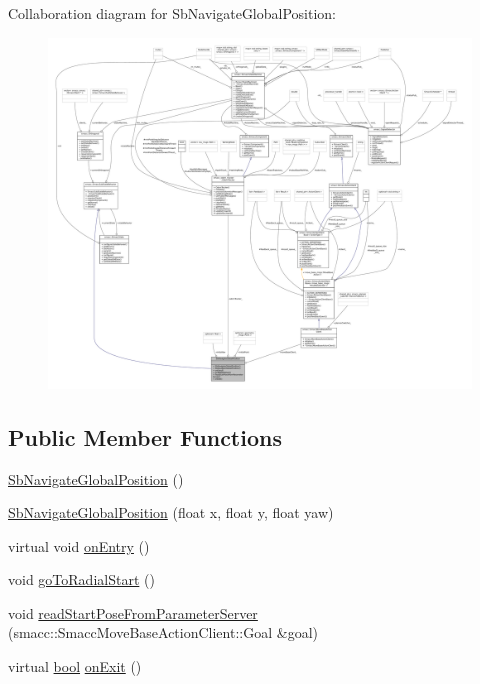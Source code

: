 Collaboration diagram for Sb\+Navigate\+Global\+Position\+:
\nopagebreak
\begin{figure}[H]
\begin{center}
\leavevmode
\includegraphics[width=350pt]{classSbNavigateGlobalPosition__coll__graph}
\end{center}
\end{figure}
\subsection*{Public Member Functions}
\begin{DoxyCompactItemize}
\item 
\hyperlink{classSbNavigateGlobalPosition_a6e1b74179781852ff41ffee65f1f01f4}{Sb\+Navigate\+Global\+Position} ()
\item 
\hyperlink{classSbNavigateGlobalPosition_a4215729ce8800e8fcfb30a120626348e}{Sb\+Navigate\+Global\+Position} (float x, float y, float yaw)
\item 
virtual void \hyperlink{classSbNavigateGlobalPosition_ae4c1f2e5de1077ee88d506eb69099f0c}{on\+Entry} ()
\item 
void \hyperlink{classSbNavigateGlobalPosition_a37b56e88ae4b01413c8fff19ee319769}{go\+To\+Radial\+Start} ()
\item 
void \hyperlink{classSbNavigateGlobalPosition_a497b26df556f99524164619deb5b2352}{read\+Start\+Pose\+From\+Parameter\+Server} (smacc\+::\+Smacc\+Move\+Base\+Action\+Client\+::\+Goal \&goal)
\item 
virtual \hyperlink{classbool}{bool} \hyperlink{classSbNavigateGlobalPosition_a9a002dcd2bcc35d8f87f79d32e47fb3c}{on\+Exit} ()
\end{DoxyCompactItemize}
